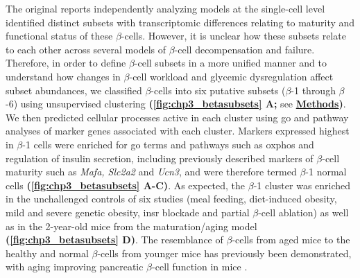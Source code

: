 \par The original reports independently analyzing models at the single-cell level identified distinct subsets with transcriptomic differences relating to maturity and functional status of these $\beta$-cells. However, it is unclear how these subsets relate to each other across several models of $\beta$-cell decompensation and failure. Therefore, in order to define $\beta$-cell subsets in a more unified manner and to understand how changes in $\beta$-cell workload and glycemic dysregulation affect subset abundances, we classified $\beta$-cells into six putative subsets ($\beta$-1 through $\beta$-6) using unsupervised clustering \textbf{(\autoref{fig:chp3_betasubsets} A;} see \hyperref[subsubsec:met_chp3_betareint]{\textbf{Methods}}\textbf{)}. We then predicted cellular processes active in each cluster using \gls{go} and pathway analyses of marker genes associated with each cluster. Markers expressed highest in $\beta$-1 cells were enriched for \gls{go} terms and pathways such as \gls{oxphos} and regulation of insulin secretion, including previously described markers of $\beta$-cell maturity such as \textit{Mafa, Slc2a2}  and \textit{Ucn3}, and were therefore termed $\beta$-1 normal cells \textbf{(\autoref{fig:chp3_betasubsets} A-C)}. As expected, the $\beta$-1 cluster was enriched in the unchallenged controls of six studies (meal feeding, diet-induced obesity, mild and severe genetic obesity, \gls{insr} blockade and partial $\beta$-cell ablation) as well as in the 2-year-old mice from the maturation/aging model \textbf{(\autoref{fig:chp3_betasubsets} D)}. The resemblance of $\beta$-cells from aged mice to the healthy and normal $\beta$-cells from younger mice has previously been demonstrated, with aging improving pancreatic $\beta$-cell function in mice \textbf{\cite{xin_single-cell_2016}}.\\ %


